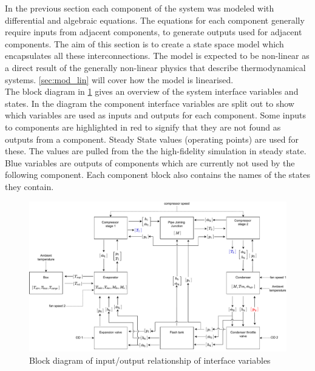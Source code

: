 
In the previous section each component of the system was modeled with differential and algebraic equations. The equations for each component generally require inputs from adjacent components, to generate outputs used for adjacent components. The aim of this section is to create a state space model which encapsulates all these interconnections. The model is expected to be non-linear as a direct result of the generally non-linear physics that describe thermodynamical systems. \cref{sec:mod_lin} will cover how the model is linearised.\\

The block diagram in \cref{fig:Block_diagram_inout} gives an overview of the system interface variables and states. In the diagram the component interface variables are split out to show which variables are used as inputs and outputs for each component. Some inputs to components are highlighted in red to signify that they are not found as outputs from a component. Steady State values (operating points) are used for these. The values are pulled from the the high-fidelity simulation in steady state. Blue variables are outputs of components which are currently not used by the following component. Each component block also contains the names of the states they contain.

\begin{figure}[h!]
	\centering
	\includegraphics[width=1\textwidth]{Graphics/Block_Diagram_inout.pdf}
	\caption{Block diagram of input/output relationship of interface variables}
	\label{fig:Block_diagram_inout}
\end{figure}



